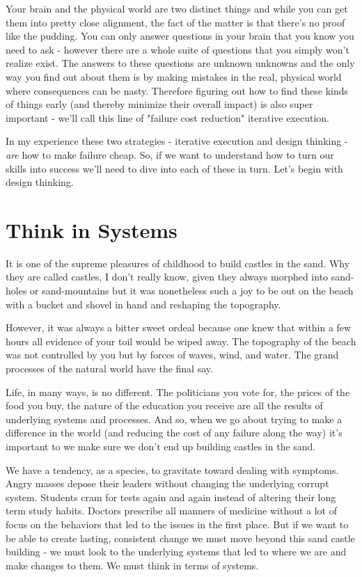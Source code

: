 \documentclass[11pt,a5paper]{book}
\begin{document}
Your brain and the physical world are two distinct things and while you can get them into pretty close alignment, the fact of the matter is that there's no proof like the pudding. You can only answer questions in your brain that you know you need to ask - however there are a whole suite of questions that you simply won't realize exist. The answers to these questions are unknown unknowns and the only way you find out about them is by making mistakes in the real, physical world where consequences can be nasty. Therefore figuring out how to find these kinds of things early (and thereby minimize their overall impact) is also super important - we'll call this line of "failure cost reduction" iterative execution.
\newline

In my experience these two strategies - iterative execution and design thinking - \textit{are} how to make failure cheap. So, if we want to understand how to turn our skills into success we'll need to dive into each of these in turn. Let's begin with design thinking.

\section{Think in Systems}
It is one of the supreme pleasures of childhood to build castles in the sand. Why they are called castles, I don't really know, given they always morphed into sand-holes or sand-mountains but it was nonetheless such a joy to be out on the beach with a bucket and shovel in hand and reshaping the topography. 
\newline

However, it was always a bitter sweet ordeal because one knew that within a few hours all evidence of your toil would be wiped away. The topography of the beach was not controlled by you but by forces of waves, wind, and water. The grand processes of the natural world have the final say.
\newline

Life, in many ways, is no different. The politicians you vote for, the prices of the food you buy, the nature of the education you receive are all the results of underlying systems and processes. And so, when we go about trying to make a difference in the world (and reducing the cost of any failure along the way) it's important to we make sure we don't end up building castles in the sand. 
\newline

We have a tendency, as a species, to gravitate toward dealing with symptoms. Angry masses depose their leaders without changing the underlying corrupt system. Students cram for tests again and again instead of altering their long term study habits. Doctors prescribe all manners of medicine without a lot of focus on the behaviors that led to the issues in the first place. But if we want to be able to create lasting, consistent change we must move beyond this sand castle building - we must look to the underlying systems that led to where we are and make changes to them. We must think in terms of systems.
\newline
\end{document}
